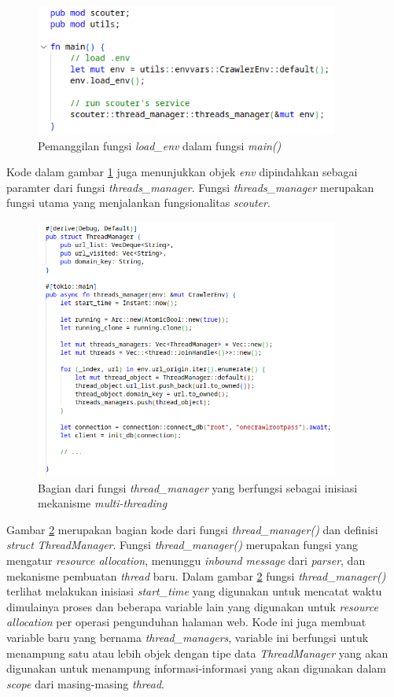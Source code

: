 \begin{figure}[H]
  \centering
  \includegraphics[keepaspectratio, width=10cm]{gambar/load_env_called.png}
  \caption{Pemanggilan fungsi \emph{load\_env} dalam fungsi \emph{main()}}
  \label{gambar:load_env-called}
\end{figure}

Kode dalam gambar \ref{gambar:load_env-called} juga menunjukkan objek \emph{env} dipindahkan sebagai paramter dari fungsi \emph{threads\_manager}. Fungsi \emph{threads\_manager} merupakan fungsi utama yang menjalankan fungsionalitas \emph{scouter}.

\begin{figure}[H]
  \centering
  \includegraphics[keepaspectratio, width=10cm]{gambar/code-thread-manager-init.png}
  \caption{Bagian dari fungsi \emph{thread\_manager} yang berfungsi sebagai inisiasi mekanisme \emph{multi-threading}}
  \label{gambar:thread-manager-func-init}
\end{figure}

Gambar \ref{gambar:thread-manager-func-init} merupakan bagian kode dari fungsi \emph{thread\_manager()} dan definisi \emph{struct} \emph{ThreadManager}. Fungsi \emph{thread\_manager()} merupakan fungsi yang mengatur \emph{resource allocation}, menunggu \emph{inbound message} dari \emph{parser}, dan mekanisme pembuatan \emph{thread} baru. Dalam gambar \ref{gambar:thread-manager-func-init} fungsi \emph{thread\_manager()} terlihat melakukan inisiasi \emph{start\_time} yang digunakan untuk mencatat waktu dimulainya proses dan beberapa variable lain yang digunakan untuk \emph{resource allocation} per operasi pengunduhan halaman web. Kode ini juga membuat variable baru yang bernama \emph{thread\_managers}, variable ini berfungsi untuk menampung satu atau lebih objek dengan tipe data \emph{ThreadManager} yang akan digunakan untuk menampung informasi-informasi yang akan digunakan dalam \emph{scope} dari masing-masing \emph{thread}.

